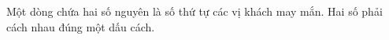 Một dòng chứa hai số nguyên là số thứ tự các vị khách may mắn. Hai số phải cách nhau đúng một dấu cách.